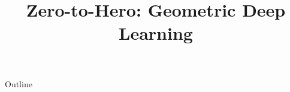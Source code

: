 \documentclass[xcolor=dvipsnames,compress,t,pdf,9pt]{beamer}
\title[\insertframenumber /\inserttotalframenumber]{Zero-to-Hero: Geometric Deep Learning}
\begin{document}
	\begin{frame}
	\titlepage
	\end{frame}
	
	\begin{frame}{Outline}
	    \tableofcontents
	\end{frame}

	
	
	
\end{document}
